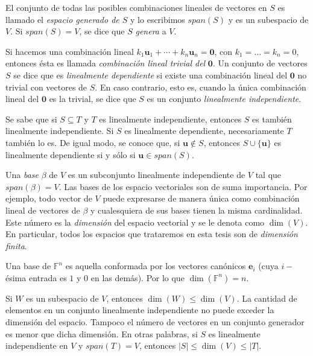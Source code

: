             El conjunto de todas las posibles combinaciones lineales de vectores en $S$ es llamado el \textit{espacio generado de $S$} y lo escribimos $span(S)$ y es un subespacio de $V$. Si $span(S) = V$, se dice que $S$ \textit{genera} a $V$.

            Si hacemos una combinación lineal $k_{1}\mathbf{u}_{1} + \cdots +k_{n}\mathbf{u}_{n} = \mathbf{0} $, con $k_{1} = \ldots= k_{n} = 0$, entonces ésta es llamada \textit{combinación lineal trivial del} $\mathbf{0}$. Un conjunto de vectores $S$ se dice que es \textit{linealmente dependiente} si existe una combinación lineal del $\mathbf{0}$ no trivial con vectores de $S$. En caso contrario, esto es, cuando la única combinación lineal del $\mathbf{0}$ es la trivial, se dice que $S$ es un conjunto \textit{linealmente independiente}.

            Se sabe que si $S \subseteq T$ y $T$ es linealmente independiente, entonces $S$ es también linealmente independiente. Si $S$ es linealmente dependiente, necesariamente $T$ también lo es. De igual modo, se conoce que, si $\mathbf{u} \notin S$, entonces $S\cup \{\mathbf{u}\}$ es linealmente dependiente si y sólo si $\mathbf{u} \in span(S)$.

            Una \textit{base} $\beta$ de $V$ es un subconjunto linealmente independiente de $V$ tal que $span(\beta) = V$. Las bases de los espacio vectoriales son de suma importancia. Por ejemplo, todo vector de $V$ puede expresarse de manera única como combinación lineal de vectores de $\beta$ y cualesquiera de sus bases tienen la misma cardinalidad. Este número es la \textit{dimensión} del espacio vectorial y se le denota como $\dim(V)$. En particular, todos los espacios que trataremos en esta tesis son de \textit{dimensión finita}.

            Una base de $\mathbb{F}^{n}$ es aquella conformada por los vectores canónicos $\mathbf{e}_{i}$ (cuya $i-$ésima entrada es $1$ y $0$ en las demás). Por lo que $\dim(\mathbb{F}^{n}) = n$.

            Si $W$ es un subespacio de $V$, entonces $\dim(W) \leq \dim(V)$. La cantidad de elementos en un conjunto linealmente independiente no puede exceder la dimensión del espacio. Tampoco el número de vectores en un conjunto generador es menor que dicha dimensión. En otras palabras, si $S$ es linealmente independiente en $V$ y $span(T)=V$, entonces $|S| \leq \dim(V) \leq |T|$.

